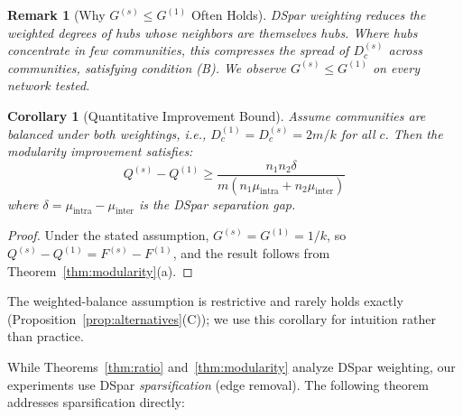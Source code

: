 \documentclass[10pt,journal,compsoc]{IEEEtran}
\newtheorem{corollary}{Corollary}
\newtheorem{remark}{Remark}
\begin{document}
\begin{remark}[Why $G^{(s)} \leq G^{(1)}$ Often Holds]
DSpar weighting reduces the weighted degrees of hubs whose neighbors are themselves hubs. Where hubs concentrate in few communities, this compresses the spread of $D_c^{(s)}$ across communities, satisfying condition (B). We observe $G^{(s)} \leq G^{(1)}$ on every network tested.
\end{remark}

\begin{corollary}[Quantitative Improvement Bound]
Assume communities are balanced under both weightings, i.e., $D_c^{(1)} = D_c^{(s)} = 2m/k$ for all $c$. Then the modularity improvement satisfies:
\begin{equation}
Q^{(s)} - Q^{(1)} \geq \frac{n_1 n_2 \delta}{m(n_1 \mu_{\text{intra}} + n_2 \mu_{\text{inter}})}
\end{equation}
where $\delta = \mu_{\text{intra}} - \mu_{\text{inter}}$ is the DSpar separation gap.
\end{corollary}

\begin{proof}
Under the stated assumption, $G^{(s)} = G^{(1)} = 1/k$, so $Q^{(s)} - Q^{(1)} = F^{(s)} - F^{(1)}$, and the result follows from Theorem~\ref{thm:modularity}(a).
\end{proof}

\noindent The weighted-balance assumption is restrictive and rarely holds exactly (Proposition~\ref{prop:alternatives}(C)); we use this corollary for intuition rather than practice.

While Theorems~\ref{thm:ratio} and~\ref{thm:modularity} analyze DSpar weighting, our experiments use DSpar \emph{sparsification} (edge removal). The following theorem addresses sparsification directly:
\end{document}

